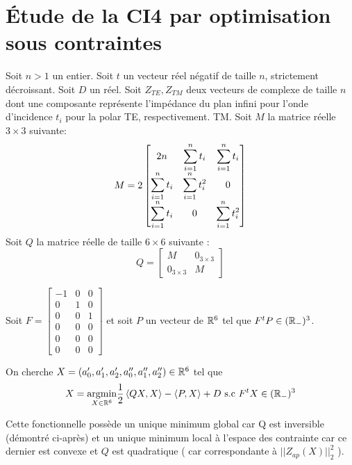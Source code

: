 \section{Étude de la CI4 par optimisation sous contraintes}

\newcommand{\st}{\ds\sum_{i=1}^n t_i}
\newcommand{\stc}{\ds\sum_{i=1}^n t_i^2 }
\newcommand{\mma}{\frac{\left(\st\right)^2 - 2n \stc}{\stc}}
\newcommand{\mmb}{\frac{\left(\st\right)^2}{\stc}}
Soit \(n>1\) un entier.
Soit \(t\) un vecteur réel négatif de taille \(n\), strictement décroissant. Soit \(D\) un réel.
Soit \(Z_{TE}, Z_{TM}\) deux vecteurs de complexe de taille \(n\) dont une composante représente l'impédance du plan infini pour l'onde d'incidence \(t_i\) pour la polar TE, respectivement. TM.
Soit \(M\) la matrice réelle \(3\times3\) suivante:
\[
M = 2\begin{bmatrix}
2n & \st & \st \\
\st & \stc & 0 \\
\st & 0 & \stc
\end{bmatrix}
\]
Soit \(Q\) la matrice réelle de taille \(6 \times 6\) suivante :
\[
Q = \begin{bmatrix}
M & 0_{3 \times 3} \\
0_{3 \times 3} & M
\end{bmatrix}
\]

Soit \(F = \begin{bmatrix}
-1 & 0 & 0 \\
0 & 1 & 0 \\
0 & 0 & 1 \\
0 & 0 & 0 \\
0 & 0 & 0 \\
0 & 0 & 0
\end{bmatrix}\) et soit \(P\) un vecteur de \(\mathbb R^6\) tel que \( F^tP  \in (\mathbb R_-)^3\).

On cherche \(X=(a_0', a_1', a_2',a_0'',a_1'',a_2'') \in \mathbb R^6\) tel que
\begin{align}
X = {\underset{X\in \mathbb R^6}{\operatorname{argmin}}} \dfrac{1}{2}\left<QX,X\right> - \left<P,X\right> + D \text{ s.c } F^tX \in (\mathbb R_-)^3
\end{align}

Cette fonctionnelle possède un unique minimum global car Q est inversible (démontré ci-après) et un unique minimum local à l'espace des contrainte car ce dernier est convexe et  \(Q\) est quadratique ( car correspondante à \(|| Z_{ap}(X)||_2^2\) ).

